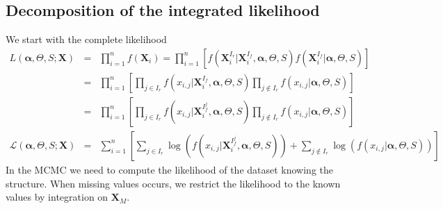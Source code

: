 \documentclass[11pt,a4paper]{report}
\begin{document}
			\subsection{Decomposition of the integrated likelihood}
We start with the complete likelihood
\begin{eqnarray}
	L(\boldsymbol{\alpha},\Theta,S;\boldsymbol{X})&=& \prod_{i=1}^n f(\boldsymbol{X}_i)= \prod_{i=1}^n\left[f(\boldsymbol{X}_i^{I_r}|\boldsymbol{X}_i^{I_f},\boldsymbol{\alpha},\Theta,S)f(\boldsymbol{X}_i^{I_f}|\boldsymbol{\alpha},\Theta,S) \right] \\
	&=&\prod_{i=1}^n\left[\prod_{j \in I_r}f(x_{i,j}|\boldsymbol{X}_i^{I_f},\boldsymbol{\alpha},\Theta,S)\prod_{j \notin I_r} f(x_{i,j}|\boldsymbol{\alpha},\Theta,S) \right] \\
	&=&\prod_{i=1}^n\left[\prod_{j \in I_r}f(x_{i,j}|\boldsymbol{X}_i^{I_f^j},\boldsymbol{\alpha},\Theta,S)\prod_{j \notin I_r} f(x_{i,j}|\boldsymbol{\alpha},\Theta,S) \right] \\
	\mathcal{L}(\boldsymbol{\alpha},\Theta,S;\boldsymbol{X})&=&\sum_{i=1}^n\left[\sum_{j \in I_r}\log \left(f(x_{i,j}|\boldsymbol{X}_i^{I_f^j},\boldsymbol{\alpha},\Theta,S)\right)+\sum_{j \notin I_r} \log \left(f(x_{i,j}|\boldsymbol{\alpha},\Theta,S)\right) \right]
\end{eqnarray}
		In the MCMC we need to compute the likelihood of the dataset knowing the structure. When missing values occurs, we restrict the likelihood to the known values by integration on $\boldsymbol{X}_M$.
				 		
\end{document}
